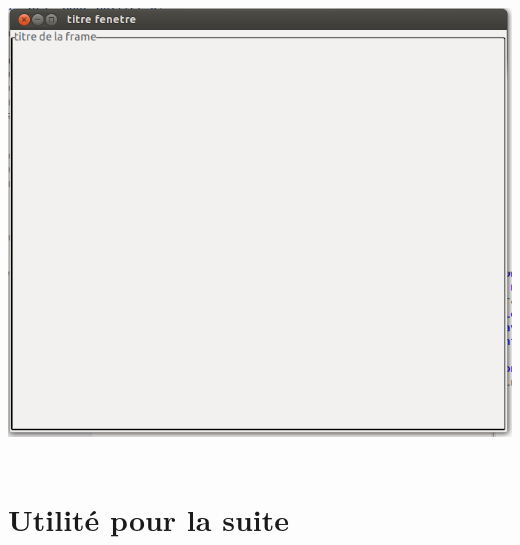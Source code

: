 \documentclass{article}
\begin{document}
\includegraphics[scale=0.5]{fenetreVide.png}\\\\


\section{Utilité pour la suite}
\end{document}
